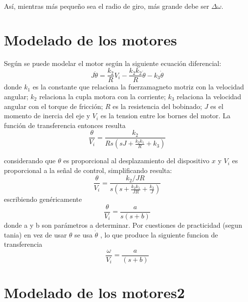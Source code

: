 \documentclass[10pt,conference,a4paper,onecolumn]{article}%
\begin{document}
Así, mientras más pequeño sea el radio de giro, más grande debe ser $\Delta \omega$.



\section{Modelado de los motores}
Según \cite{alex} se puede modelar el motor según la siguiente ecuación diferencial:
\begin{equation}
J\ddot{\theta}=\frac{k_2}{R}V_i-\frac{k_2 k_2}{R} \dot{\theta}-k_3\dot{\theta} 
\end{equation}
donde $k_1$ es la constante que relaciona la fuerzamagneto motriz con la velocidad angular; $k_2$ relaciona la cupla motora con la corriente; $k_3$ relaciona la velocidad angular con el torque de fricción; $R$ es la resistencia del bobinado; $J$ es el momento de inercia del eje y $V_i$ es la tension entre los bornes del motor.
La función de transferencia entonces resulta
\begin{equation}
\frac{\theta}{V_i}=\frac{k_2}{Rs(sJ+\frac{k_2k_1}{R}+k_3)}
\end{equation}

considerando que $\theta$ es proporcional al desplazamiento del dispositivo $x$ y $V_i$ es proporcional a la señal de control, simplificando resulta:
\begin{equation}
\frac{\theta}{V_i}=\frac{k_2/{JR}}{s(s+\frac{k_2k_1}{JR}+ \frac{k_3}{J} )}
\end{equation} 
escribiendo genéricamente 
\begin{equation}
\frac{\theta}{V_i}=\frac{a}{s(s+b)}
\end{equation}
 donde a y b son parámetros a determinar. Por cuestiones de practicidad (segun tania) en vez de usar $\theta$ se usa $\dot{\theta}$ , lo que produce la siguiente funcion de transferencia
 \begin{equation}
 \frac{\omega}{V_i}=\frac{a}{(s+b)}
 \end{equation}
 
 \section{Modelado de los motores2 }
 
\end{document}
